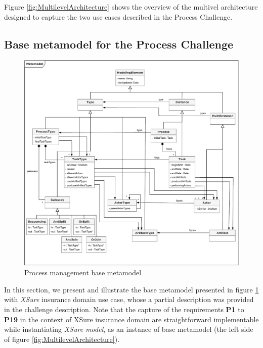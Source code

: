 

Figure \ref{fig:MultilevelArchitecture} shows the overview of the multivel architecture designed to capture the two use cases described in the Process Challenge.


\subsection{Base metamodel for the Process Challenge}

\begin{figure}
 \centering
    \includegraphics[width=1.0 \textwidth]{Figures/Metamodel.pdf}
     \caption{Process management base metamodel}
    \label{fig:BaseMetamodel}
\end{figure}

In this section, we present and illustrate the base metamodel presented in figure \ref{fig:BaseMetamodel} with \textit{XSure} insurance domain use case, whose a partial description was provided in the challenge description. Note that the capture of the requirements \textbf{P1} to \textbf{P19} in the context of XSure insurance domain are straightforward implementable while instantiating \textit{XSure model}, as an instance of base metamodel (the left side of figure \ref{fig:MultilevelArchitecture}).

